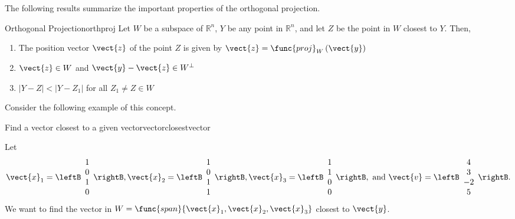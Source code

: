 The following results summarize the important properties of the orthogonal projection. 

\begin{theorem}{Orthogonal Projection}{orthproj}
Let $W$ be a subspace of $\mathbb{R}^n$, $Y$ be any point in $\mathbb{R}^n$, and let $Z$ be the point in $W$ closest to $Y$. Then, 
\begin{enumerate}
\item 
The position vector $\vect{z}$ of the point $Z$ is given by $\vect{z} = \func{proj}_{W}\left( \vect{y}\right)$
\item
$\vect{z} \in W$ and $\vect{y} - \vect{z} \in W^{\perp}$
\item
$| Y - Z | < | Y - Z_1 |$ for all $Z_1 \neq Z \in W$
\end{enumerate}
\end{theorem}

Consider the following example of this concept.

\begin{example}{Find a vector closest to a given vector}{vectorclosestvector}

Let
\[ \vect{x}_1=\leftB\begin{array}{c} 1\\ 0\\ 1\\ 0 \end{array}\rightB,
\vect{x}_2=\leftB\begin{array}{c} 1\\ 0\\ 1\\ 1 \end{array}\rightB,
\vect{x}_3=\leftB\begin{array}{c} 1\\ 1\\ 0\\ 0 \end{array}\rightB,
\mbox{ and }
\vect{v}=\leftB\begin{array}{c} 4\\ 3\\ -2\\ 5 \end{array}\rightB. \]
We want to find the vector in
$W =\func{span}\{\vect{x}_1, \vect{x}_2,\vect{x}_3\}$
closest to $\vect{y}$.
\end{example}

